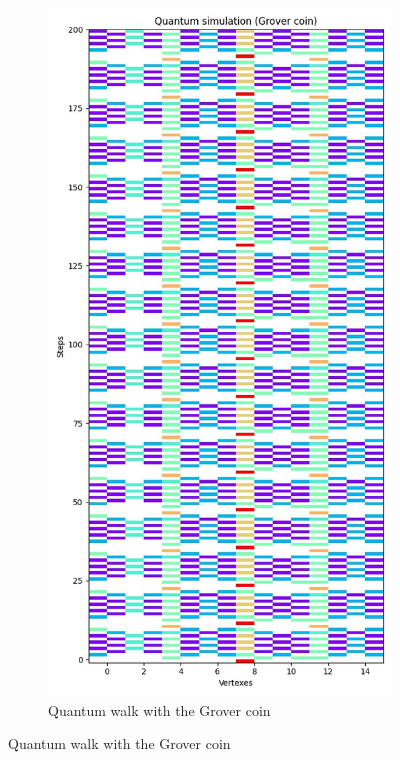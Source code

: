 \begin{figure}[H]
  \centering
  \begin{subfigure}{.45\linewidth}
    \centering
    \includegraphics[width=\linewidth]{./figures/results/grid/grover.jpg}
    \caption{Quantum walk with the Grover coin}

\end{subfigure}
\end{figure}
